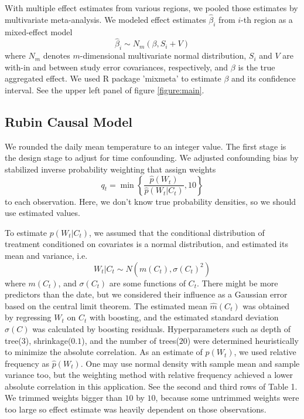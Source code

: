 \documentclass[12pt]{article}
\begin{document}
With multiple effect estimates from various regions,
we pooled those estimates by multivariate meta-analysis.
We modeled effect estimates $\hat{\beta}_i$ from $i$-th region as a mixed-effect model
\[
	\hat{\beta}_i \sim N_m(\beta, S_i + V)
\]
where $N_m$ denotes $m$-dimensional multivariate normal distribution,
$S_i$ and $V$ are with-in and between study error covariances, respectively,
and $\beta$ is the true aggregated effect.
We used R package 'mixmeta' to estimate $\beta$ and its confidence interval.
See the upper left panel of figure \ref{figure:main}.


\subsection{Rubin Causal Model}

We rounded the daily mean temperature to an integer value.
The first stage is the design stage to adjust for time confounding.
We adjusted confounding bias by stabilized inverse probability weighting\cite{sipw2010}
that assign weights
\[
	q_t = \min{ \left \{ \frac{\hat{p}(W_t)}{\hat{p}(W_t \lvert C_t)}, 10 \right \} }
\]
to each observation.
Here, we don't know true probability densities,
so we should use estimated values.

To estimate $p(W_t \lvert C_t)$, 
we assumed that 
the conditional distribution of treatment conditioned on covariates is a normal distribution, 
and estimated its mean and variance, i.e.
\[ 
	W_t\lvert C_t \sim N(m(C_t), \sigma(C_t)^2) 
\] 
where $m(C_t)$, and $\sigma(C_t)$ are some functions of $C_t$.
There might be more predictors than the date,
but we considered their influence as a Gaussian error based on the central limit theorem.
The estimated mean $\hat{m}(C_t)$ was obtained by regressing $W_t$ on $C_t$ with boosting, 
and the estimated standard deviation $\hat{\sigma}(C)$ was calculated
by boosting residuals\cite{hirano2004, gpsboosting2015}.
Hyperparameters such as depth of tree($3$), shrinkage($0.1$), and the number of trees($20$) 
were determined heuristically to minimize the absolute correlation.
As an estimate of $p(W_t)$, we used relative frequency as $\hat{p}(W_t)$.
One may use normal density with sample mean and sample variance too, but
the weighting method with relative frequency achieved a lower absolute correlation in this application.
See the second and third rows of Table 1.
We trimmed weights bigger than $10$ by $10$,
because some untrimmed weights were too large so
effect estimate was heavily dependent on those observations.
\end{document}
